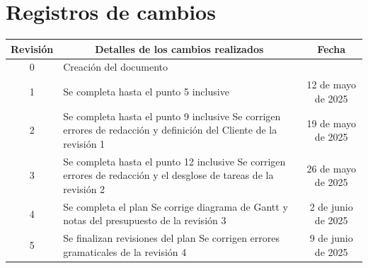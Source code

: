 \documentclass[
11pt, %
]{charter}
\begin{document}
\maketitle
\thispagestyle{empty}
\pagebreak


\thispagestyle{empty}
{\setlength{\parskip}{0pt}
\tableofcontents{}
}
\pagebreak


\section*{Registros de cambios}
\label{sec:registro}


\begin{table}[ht]
\label{tab:registro}
\centering
\begin{tabularx}{\linewidth}{@{}|c|X|c|@{}}
\hline
\rowcolor[HTML]{C0C0C0} 
Revisión & \multicolumn{1}{c|}{\cellcolor[HTML]{C0C0C0}Detalles de los cambios realizados} & Fecha	\\ \hline
0      & Creación del documento                                 &\fechaInicioName					\\ \hline
1      & Se completa hasta el punto 5 inclusive                 & {12} de {mayo} de 2025			\\ \hline
2      & Se completa hasta el punto 9 inclusive \newline Se corrigen errores de redacción y definición del Cliente de la revisión 1	& {19} de {mayo} de 2025			\\ \hline
3      & Se completa hasta el punto 12 inclusive \newline Se corrigen errores de redacción y el desglose de tareas de la revisión 2	& {26} de {mayo} de 2025			\\ \hline
4      & Se completa el plan \newline Se corrige diagrama de Gantt y notas del presupuesto de la revisión 3	& {2} de {junio} de 2025			\\ \hline
5      & Se finalizan revisiones del plan \newline Se corrigen errores gramaticales de la revisión 4	& {9} de {junio} de 2025			\\ \hline


\end{tabularx}
\end{table}
\end{document}
